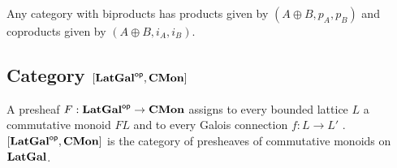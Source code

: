 Any category with biproducts has products given by $(A \oplus B, p_A, p_B)$ and coproducts given by $(A \oplus
B, i_A, i_B)$.

\subsection{Category $[\mathbf{LatGal}^{\mathsf{op}},\mathbf{CMon}]$}

A presheaf $F: \mathbf{LatGal}^{\mathsf{op}} \to \mathbf{CMon}$ assigns to every
bounded lattice $L$ a commutative monoid $FL$ and to every Galois connection $f: L \to L'$ .
$[\mathbf{LatGal}^{\mathsf{op}},\mathbf{CMon}]$ is the category of presheaves of commutative monoids on $\mathbf{LatGal}$.
